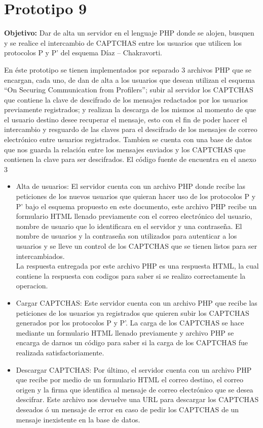 \section{Prototipo 9}
\textbf{Objetivo:} Dar de alta un servidor en el lenguaje PHP donde se alojen, busquen y se realice el intercambio de CAPTCHAS entre los usuarios que utilicen los protocolos P y P’ del esquema Díaz – Chakravorti.

En éste prototipo se tienen implementados por separado 3 archivos PHP que se encargan, cada uno, de dan de alta a los usuarios que desean utilizan el esquema “On Securing  Communication  from Profilers”; subir al servidor los CAPTCHAS que contiene la clave de descifrado de los mensajes redactados por los usuarios previamente registrados; y realizan la descarga de los mismos al momento de que el usuario destino desee recuperar el mensaje, esto con el fin de poder hacer el intercambio y resguardo de las claves para el descifrado de los mensajes de correo electrónico entre usuarios registrados. Tambien se cuenta con una base de datos que nos guarda la relación entre los mensajes enviados y los CAPTCHAS que contienen la clave para ser descifrados. El código fuente de encuentra en el anexo 3
\begin{itemize}
 \item Alta de usuarios: El servidor cuenta con un archivo PHP donde recibe las peticiones de los nuevos usuarios que quieran hacer uso de los protocolos P y P’ bajo el esquema propuesto en este documento, este archivo PHP recibe un formulario HTML llenado previamente con el correo electrónico del usuario, nombre de usuario que lo identificara en el servidor y una contraseña. El nombre de usuarios y la contraseña son utilizados para autenticar a los usuarios y se lleve un control de los CAPTCHAS que se tienen listos para ser intercambiados. \\
 La respuesta entregada por este archivo PHP es una respuesta HTML, la cual contiene la respuesta con codigos para saber si se realizo correctamente la operacion.

 \item Cargar CAPTCHAS: Este servidor cuenta con un archivo PHP que recibe las peticiones de los usuarios ya registrados que quieren subir los CAPTCHAS generados por los protocolos P y P’. La carga de los CAPTCHAS se hace mediante un formulario HTML llenado previamente y archivo PHP se encarga de darnos un código para saber si la carga de los CAPTCHAS fue realizada satisfactoriamente.

 \item Descargar CAPTCHAS: Por último, el servidor cuenta con un archivo PHP que recibe por medio de un formulario HTML el correo destino, el correo origen y la firma que identifica al mensaje de correo electrónico que se desea descifrar. Este archivo nos devuelve una URL para descargar los CAPTCHAS deseados ó un mensaje de error en caso de pedir los CAPTCHAS de un mensaje inexistente en la base de datos.

\end{itemize}
